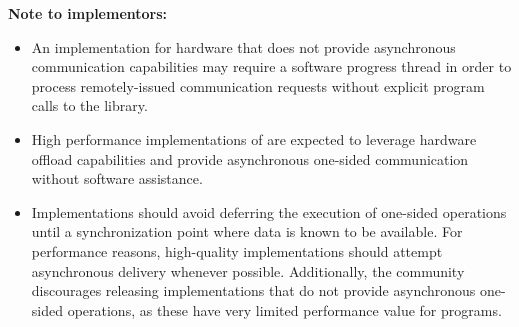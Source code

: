 \textbf{Note to implementors:}
\begin{itemize}
  \item An \openshmem implementation for hardware that does not provide
      asynchronous communication capabilities may require a software progress
      thread in order to process remotely-issued communication requests without
      explicit program calls to the \openshmem library.  
  \item High performance implementations of \openshmem are expected to leverage
      hardware offload capabilities and provide asynchronous one-sided
      communication without software assistance.
  \item Implementations should avoid deferring the execution of one-sided
      operations until a synchronization point where data is known to be
      available. For performance reasons, high-quality implementations should 
      attempt asynchronous delivery whenever possible. Additionally, the \openshmem
      community discourages releasing \openshmem implementations that do not
      provide asynchronous one-sided operations, as these have very limited
      performance value for \openshmem programs.
\end{itemize}
